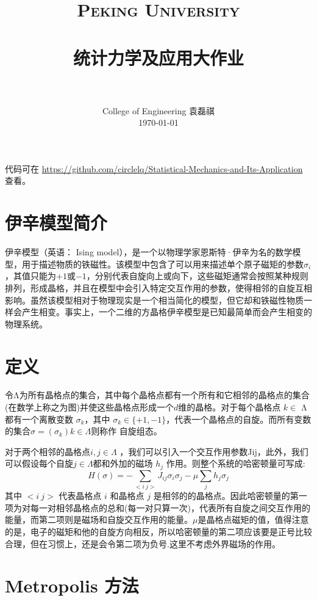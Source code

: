 \documentclass[12pt]{article}
\title{
		\vspace{-1in} 	
		\usefont{OT1}{bch}{b}{n}
		\normalfont \normalsize \textsc{\LARGE Peking University}\\[0.2cm] %
		\horrule{0.5pt} \\[0.2cm]
		\huge \bfseries{统计力学及应用大作业} \\[-0.2cm]
		\horrule{2pt} \\[0.2cm]
}
\author{
		\normalfont 								\normalsize
		College of Engineering \quad 2001111690  \quad 袁磊祺\\	\normalsize
        \today
}
\date{}
\begin{document}


\maketitle

代码可在 \href{https://github.com/circlelq/Statistical-Mechanics-and-Its-Application}{https://github.com/circlelq/Statistical-Mechanics-and-Its-Application} 查看。


\section{伊辛模型简介}

伊辛模型（英语： Ising model），是一个以物理学家恩斯特·伊辛为名的数学模型，用于描述物质的铁磁性。该模型中包含了可以用来描述单个原子磁矩的参数$\sigma_i$ ，其值只能为$+1$或$-1$，分别代表自旋向上或向下，这些磁矩通常会按照某种规则排列，形成晶格，并且在模型中会引入特定交互作用的参数，使得相邻的自旋互相影响。虽然该模型相对于物理现实是一个相当简化的模型，但它却和铁磁性物质一样会产生相变。事实上，一个二维的方晶格伊辛模型是已知最简单而会产生相变的物理系统。

\section{定义}

令Λ为所有晶格点的集合，其中每个晶格点都有一个所有和它相邻的晶格点的集合(在数学上称之为图)并使这些晶格点形成一个$d$维的晶格。对于每个晶格点 $k\in$ Λ 都有一个离散变数 $\sigma_k$，其中 $\sigma_k  \in \{+1, −1\}$，代表一个晶格点的自旋。而所有变数的集合$\sigma = (\sigma_k)k\in \Lambda$则称作 自旋组态。

对于两个相邻的晶格点$i, j \in \Lambda$ ，我们可以引入一个交互作用参数Jij，此外，我们可以假设每个自旋$j\in \Lambda$都和外加的磁场 $h_j$ 作用。则整个系统的哈密顿量可写成:
\begin{equation}
	H(\sigma )=-\sum _{{<i~j>}}J_{{ij}}\sigma _{i}\sigma _{j}-\mu \sum _{{j}}h_{j}\sigma_{j}
\end{equation}
其中 $<i~j>$ 代表晶格点 $i$ 和晶格点 $j$ 是相邻的的晶格点。因此哈密顿量的第一项为对每一对相邻晶格点的总和(每一对只算一次)，代表所有自旋之间交互作用的能量，而第二项则是磁场和自旋交互作用的能量。$\mu$是晶格点磁矩的值，值得注意的是，电子的磁矩和他的自旋方向相反，所以哈密顿量的第二项应该要是正号比较合理，但在习惯上，还是会令第二项为负号.这里不考虑外界磁场的作用。


\section{Metropolis 方法}
\end{document}
